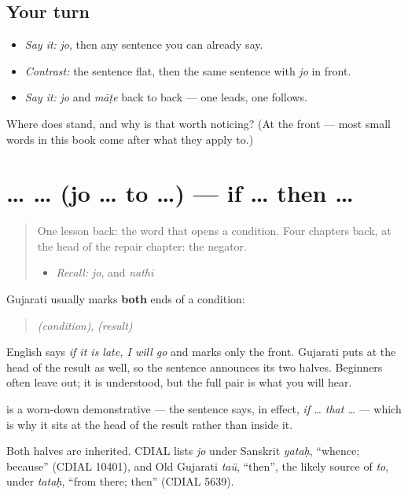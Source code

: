 \subsection*{Your turn}
\begin{itemize}
\raggedright
  \item \emph{Say it:} \emph{jo}, then any sentence you can already say.
  \item \emph{Contrast:} the sentence flat, then the same sentence with \emph{jo} in front.
  \item \emph{Say it:} \emph{jo} and \emph{māṭe} back to back — one leads, one follows.
\end{itemize}

\begin{tcolorbox}[breakable,colback=teal!4,colframe=teal!35!black,title={Before you move on}]
Where does \textbf{} stand, and why is that worth noticing? (At the front — most small words in this book come after what they apply to.)
\end{tcolorbox}
\section[\texorpdfstring{\gu{જો} … \gu{તો} … (jo … to …)}{જો … તો … (jo … to …)}]{ …  … (jo … to …) — if … then …}

\label{lesson:GU-C35-jo-to}



\begin{quote}
One lesson back: the word that opens a condition. Four chapters back, at the head of the repair chapter: the negator.

\begin{itemize}
\raggedright
  \item \emph{Recall:} \emph{jo}, and \emph{nathī}
\end{itemize}
\end{quote}

\begin{cousinweb}
Gujarati usually marks \textbf{both} ends of a condition:

\begin{quote}
\textbf{} \emph{(condition)}, \textbf{} \emph{(result)}
\end{quote}

English says \emph{if it is late, I will go} and marks only the front. Gujarati puts \textbf{} at the head of the result as well, so the sentence announces its two halves. Beginners often leave \textbf{} out; it is understood, but the full pair is what you will hear.

\textbf{} is a worn-down demonstrative — the sentence says, in effect, \emph{if … that …} — which is why it sits at the head of the result rather than inside it.

Both halves are inherited. CDIAL lists \emph{jo} under Sanskrit \emph{yataḥ}, \textquotedblleft{}whence; because\textquotedblright{} (CDIAL 10401), and Old Gujarati \emph{taü}, \textquotedblleft{}then\textquotedblright{}, the likely source of \emph{to}, under \emph{tataḥ}, \textquotedblleft{}from there; then\textquotedblright{} (CDIAL 5639).
\end{cousinweb}


